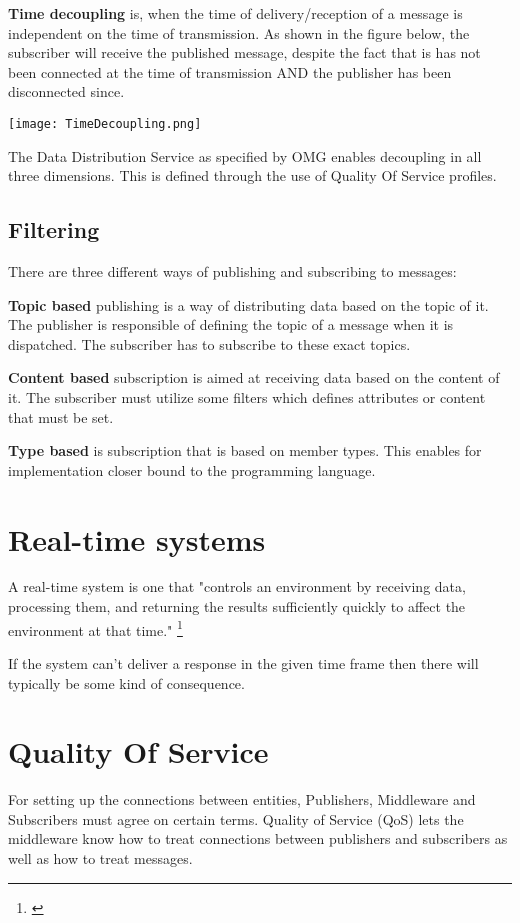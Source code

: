 \textbf{Time decoupling} is, when the time of delivery/reception of a message is independent on the time of transmission. As shown in the figure below, the subscriber will receive the published message, despite the fact that is has not been connected at the time of transmission AND the publisher has been disconnected since.

\begin{center}
	\texttt{[image: TimeDecoupling.png]}
\end{center}

The Data Distribution Service as specified by OMG enables decoupling in all three  dimensions. This is defined through the use of Quality Of Service profiles.

\subsection{Filtering}
There are three different ways of publishing and subscribing to messages:

\textbf{Topic based} publishing is a way of distributing data based on the topic of it. The publisher is responsible of defining the topic of a message when it is dispatched. The subscriber has to subscribe to these exact topics.

\textbf{Content based} subscription is aimed at receiving data based on the content of it. The subscriber must utilize some filters which defines attributes or content that must be set.

\textbf{Type based} is subscription that is based on member types. This enables for implementation closer bound to the programming language.


\section{Real-time systems}
A real-time system is one that "controls an environment by receiving data, processing them, and returning the results sufficiently quickly to affect the environment at that time." \footnote{\citep{Distributed Systems}}

If the system can't deliver a response in the given time frame then there will typically be some kind of consequence.

\section{Quality Of Service}
For setting up the connections between entities, Publishers, Middleware and Subscribers must agree on certain terms. Quality of Service (QoS) lets the middleware know how to treat connections between publishers and subscribers as well as how to treat messages.


